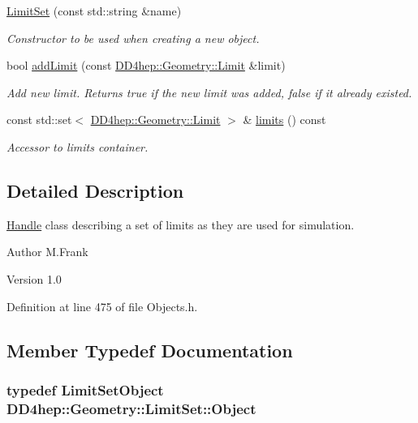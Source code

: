 \begin{DoxyCompactItemize}
\hyperlink{class_d_d4hep_1_1_geometry_1_1_limit_set_ab60ed00860a4026b6697aef637cf61ee}{LimitSet} (const std::string \&name)
\begin{DoxyCompactList}\small\item\em Constructor to be used when creating a new object. \item\end{DoxyCompactList}\item 
bool \hyperlink{class_d_d4hep_1_1_geometry_1_1_limit_set_a7cbdab17081174e9a0d1d8ce71246700}{addLimit} (const \hyperlink{class_d_d4hep_1_1_geometry_1_1_limit}{DD4hep::Geometry::Limit} \&limit)
\begin{DoxyCompactList}\small\item\em Add new limit. Returns true if the new limit was added, false if it already existed. \item\end{DoxyCompactList}\item 
const std::set$<$ \hyperlink{class_d_d4hep_1_1_geometry_1_1_limit}{DD4hep::Geometry::Limit} $>$ \& \hyperlink{class_d_d4hep_1_1_geometry_1_1_limit_set_a5c175414806164d6cac89b749d08d909}{limits} () const 
\begin{DoxyCompactList}\small\item\em Accessor to limits container. \item\end{DoxyCompactList}\end{DoxyCompactItemize}


\subsection{Detailed Description}
\hyperlink{class_d_d4hep_1_1_handle}{Handle} class describing a set of limits as they are used for simulation. \begin{DoxyAuthor}{Author}
M.Frank 
\end{DoxyAuthor}
\begin{DoxyVersion}{Version}
1.0 
\end{DoxyVersion}


Definition at line 475 of file Objects.h.

\subsection{Member Typedef Documentation}
\hypertarget{class_d_d4hep_1_1_geometry_1_1_limit_set_a7fc622c60ba15cb5149d6d2ea21ed42e}{
\subsubsection[{Object}]{\setlength{\rightskip}{0pt plus 5cm}typedef {\bf LimitSetObject} {\bf DD4hep::Geometry::LimitSet::Object}}}
\label{class_d_d4hep_1_1_geometry_1_1_limit_set_a7fc622c60ba15cb5149d6d2ea21ed42e}


